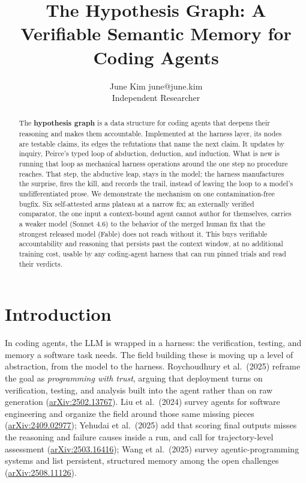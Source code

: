 \documentclass[
  10pt,
]{article}
\title{The Hypothesis Graph: A Verifiable Semantic Memory for Coding Agents}
\author{\name June Kim \email june@june.kim \\
      \addr Independent Researcher}
\begin{document}
\maketitle
\begin{abstract}
The \textbf{hypothesis graph} is a data structure for coding agents that
deepens their reasoning and makes them accountable. Implemented at the
harness layer, its nodes are testable claims, its edges the refutations
that name the next claim. It updates by inquiry, Peirce's typed loop of
abduction, deduction, and induction. What is new is running that loop as
mechanical harness operations around the one step no procedure reaches.
That step, the abductive leap, stays in the model; the harness
manufactures the surprise, fires the kill, and records the trail,
instead of leaving the loop to a model's undifferentiated prose. We
demonstrate the mechanism on one contamination-free bugfix. Six
self-attested arms plateau at a narrow fix; an externally verified
comparator, the one input a context-bound agent cannot author for
themselves, carries a weaker model (Sonnet 4.6) to the behavior of the
merged human fix that the strongest released model (Fable) does not
reach without it. This buys verifiable accountability and reasoning that
persists past the context window, at no additional training cost, usable
by any coding-agent harness that can run pinned trials and read their
verdicts.
\end{abstract}

\section{Introduction}\label{introduction}

In coding agents, the LLM is wrapped in a harness: the verification,
testing, and memory a software task needs. The field building these is
moving up a level of abstraction, from the model to the harness.
Roychoudhury et al.~(2025) reframe the goal as \emph{programming with
trust}, arguing that deployment turns on verification, testing, and
analysis built into the agent rather than on raw generation
(\href{https://arxiv.org/abs/2502.13767}{arXiv:2502.13767}). Liu et
al.~(2024) survey agents for software engineering and organize the field
around those same missing pieces
(\href{https://arxiv.org/abs/2409.02977}{arXiv:2409.02977}); Yehudai et
al.~(2025) add that scoring final outputs misses the reasoning and
failure causes inside a run, and call for trajectory-level assessment
(\href{https://arxiv.org/abs/2503.16416}{arXiv:2503.16416}); Wang et
al.~(2025) survey agentic-programming systems and list persistent,
structured memory among the open challenges
(\href{https://arxiv.org/abs/2508.11126}{arXiv:2508.11126}).
\end{document}
